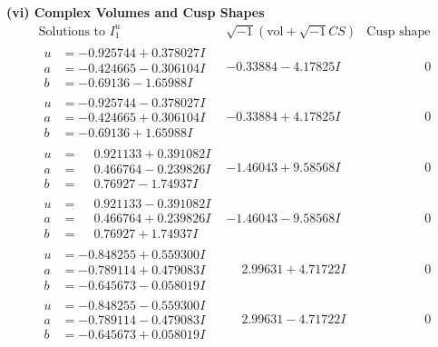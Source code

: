 \documentclass[1p]{elsarticle_modified}
\theoremstyle{definition}
\newcommand{\I}{\sqrt{-1}}
\begin{document}
\newpage\flushleft \textbf{(vi) Complex Volumes and Cusp Shapes}
$$\begin{array}{c|c|c}  
\text{Solutions to }I^u_{1}& \I (\text{vol} + \sqrt{-1}CS) & \text{Cusp shape}\\
 \hline 
\begin{aligned}
u &= -0.925744 + 0.378027 I \\
a &= -0.424665 - 0.306104 I \\
b &= -0.69136 - 1.65988 I\end{aligned}
 & -0.33884 - 4.17825 I & \phantom{-0.000000 } 0 \\ \hline\begin{aligned}
u &= -0.925744 - 0.378027 I \\
a &= -0.424665 + 0.306104 I \\
b &= -0.69136 + 1.65988 I\end{aligned}
 & -0.33884 + 4.17825 I & \phantom{-0.000000 } 0 \\ \hline\begin{aligned}
u &= \phantom{-}0.921133 + 0.391082 I \\
a &= \phantom{-}0.466764 - 0.239826 I \\
b &= \phantom{-}0.76927 - 1.74937 I\end{aligned}
 & -1.46043 + 9.58568 I & \phantom{-0.000000 } 0 \\ \hline\begin{aligned}
u &= \phantom{-}0.921133 - 0.391082 I \\
a &= \phantom{-}0.466764 + 0.239826 I \\
b &= \phantom{-}0.76927 + 1.74937 I\end{aligned}
 & -1.46043 - 9.58568 I & \phantom{-0.000000 } 0 \\ \hline\begin{aligned}
u &= -0.848255 + 0.559300 I \\
a &= -0.789114 + 0.479083 I \\
b &= -0.645673 - 0.058019 I\end{aligned}
 & \phantom{-}2.99631 + 4.71722 I & \phantom{-0.000000 } 0 \\ \hline\begin{aligned}
u &= -0.848255 - 0.559300 I \\
a &= -0.789114 - 0.479083 I \\
b &= -0.645673 + 0.058019 I\end{aligned}
 & \phantom{-}2.99631 - 4.71722 I & \phantom{-0.000000 } 0 \\ \hline\begin{aligned}

\end{aligned}
\end{array}$$
\end{document}
